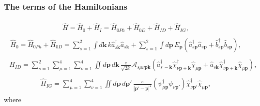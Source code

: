 \documentclass{report}
\begin{document}
\subsubsection{The terms of the Hamiltonians}
\begin{align}
\begin{aligned}
	\hat H = \hat H_{0} + \hat H_{I} = \hat H_{0 Ph} + \hat H_{0 D} + \hat H_{I D} + \hat H_{I G},
\end{aligned}
\end{align}
\begin{align}
\begin{aligned}
	\hat H_{0} = \hat H_{0 Ph} + \hat H_{0 D} = 
		\sum_{s=1}^2 \int d\boldsymbol{k}\, k
			\hat a^\dagger_{s \boldsymbol{k}} \hat a_{s \boldsymbol{k}} + 
		\sum_{s=1}^2 \int d\boldsymbol{p}\, E_{\boldsymbol{p}} (
			\hat a^\dagger_{s \boldsymbol{p}} \hat a_{s \boldsymbol{p}} + 
			\hat b^\dagger_{s \boldsymbol{p}} \hat b_{s \boldsymbol{p}}
		),
	\label{H_0_01}
\end{aligned}
\end{align}
\begin{align}
\begin{aligned}
	\hat H_{I D} = \sum_{s=1}^2 \sum_{\mu=1}^4\sum_{\nu=1}^4 \iint d\boldsymbol{p}\, d\boldsymbol{k}\, 
		\frac{e}{\sqrt{2 k}} \mathcal{A}_{s \mu \nu \boldsymbol{p} \boldsymbol{k}} (
			\hat a^\dagger_{s\,-\boldsymbol{k}}	
				\hat \chi^\dagger_{\nu \boldsymbol{p} + \boldsymbol{k}} \hat \chi_{\mu \boldsymbol{p}} +
			\hat a_{s \boldsymbol{k}}
				\hat \chi^\dagger_{\nu \boldsymbol{p} + \boldsymbol{k}} \hat \chi_{\mu \boldsymbol{p}}
		),
	\label{H_ID_01}
\end{aligned}
\end{align}
\begin{align}
\begin{aligned}
	\hat H_{I G} = \sum_{\mu=1}^4\sum_{\nu=1}^4 \iint d\boldsymbol{p}\, d\boldsymbol{p}'\, 
		\frac{e}{|\boldsymbol{p}' - \boldsymbol{p}|^2} 
		(\psi_{\mu \boldsymbol{p}}^\dagger \psi_{\nu \boldsymbol{p}'})
		\hat \chi^\dagger_{\nu \boldsymbol{p'}} \hat \chi_{\mu \boldsymbol{p}},
	\label{H_IG_01}
\end{aligned}
\end{align}
where %
\end{document}

